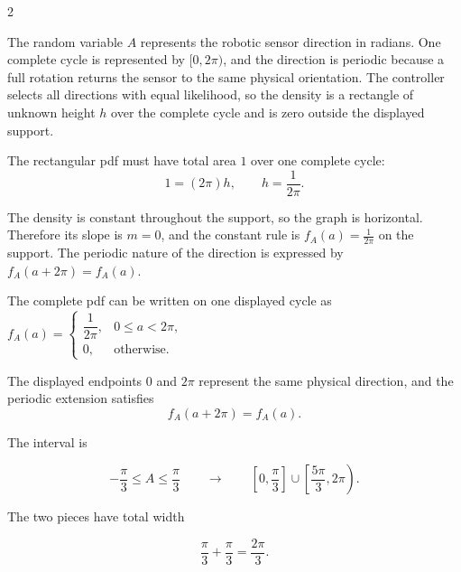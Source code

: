 	\setlength{\columnseprule}{0.4pt}
	\begin{multicols}{2}
		
		The random variable $A$ represents the robotic sensor direction in radians.
		One complete cycle is represented by $[0,2\pi)$, and the direction is
		periodic because a full rotation returns the sensor to the same physical
		orientation. The controller selects all directions with equal likelihood,
		so the density is a rectangle of unknown height $h$ over the complete cycle
		and is zero outside the displayed support.
		
		
		\columnbreak
		
		The rectangular pdf must have total area $1$ over one complete cycle:
		\[
		1=(2\pi)h,
		\qquad
		h=\frac1{2\pi}.
		\]
		

		
	\end{multicols}
	\setlength{\columnseprule}{0pt}
	
	The density is constant throughout the support, so the graph is horizontal.
	Therefore its slope is $m=0$, and the constant rule is
	$f_A(a)=\frac1{2\pi}$ on the support. The periodic nature of the direction
	is expressed by
	$f_A(a+2\pi)=f_A(a)$.
	
	The complete pdf can be written on one displayed cycle as
	\(
	f_A(a)=
	\begin{cases}
		\dfrac1{2\pi},&0\le a<2\pi,\\[1mm]
		0,&\text{otherwise}.
	\end{cases}
	\)
	

	The displayed endpoints $0$ and $2\pi$ represent the same physical
	direction, and the periodic extension satisfies
	\[
	f_A(a+2\pi)=f_A(a).
	\]
	
	
	The interval is
	
	
	$$
	-\frac{\pi}{3}\le A\le\frac{\pi}{3}
	\qquad\longrightarrow\qquad
	\left[0,\frac{\pi}{3}\right]\cup
	\left[\frac{5\pi}{3},2\pi\right).
	$$
	
	The two pieces have total width
	
	$$
	\frac{\pi}{3}+\frac{\pi}{3}
	=\frac{2\pi}{3}.
	$$
	
